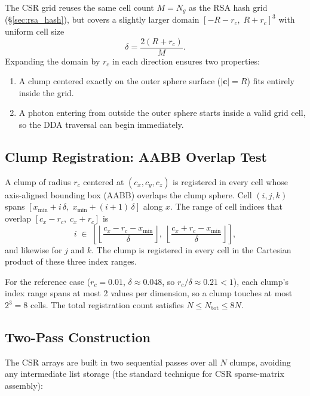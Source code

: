 \documentclass[english,a4paper]{my_memo}
\begin{document}
The CSR grid reuses the same cell count $M = N_g$ as the RSA hash grid
(\S\ref{sec:rsa_hash}), but covers a slightly larger domain
$[-R - r_c,\; R + r_c]^3$ with uniform cell size
\begin{equation}
  \delta = \frac{2(R + r_c)}{M}.
\end{equation}
Expanding the domain by $r_c$ in each direction ensures two properties:
\begin{enumerate}
  \item A clump centered exactly on the outer sphere surface
        ($|\mathbf{c}| = R$) fits entirely inside the grid.
  \item A photon entering from outside the outer sphere starts inside a
        valid grid cell, so the DDA traversal can begin immediately.
\end{enumerate}

\subsection{Clump Registration: AABB Overlap Test}
\label{sec:aabb}

A clump of radius $r_c$ centered at $(c_x, c_y, c_z)$ is registered in every
cell whose axis-aligned bounding box (AABB) overlaps the clump sphere.
Cell $(i,j,k)$ spans $[x_\mathrm{min}+i\,\delta,\; x_\mathrm{min}+(i+1)\,\delta]$
along $x$.  The range of cell indices that overlap $[c_x - r_c,\; c_x + r_c]$ is
\begin{equation}
  i \;\in\; \left[
    \left\lfloor\frac{c_x - r_c - x_\mathrm{min}}{\delta}\right\rfloor,\;
    \left\lfloor\frac{c_x + r_c - x_\mathrm{min}}{\delta}\right\rfloor
  \right],
  \label{eq:aabb_range}
\end{equation}
and likewise for $j$ and $k$.  The clump is registered in every cell in the
Cartesian product of these three index ranges.

For the reference case ($r_c = 0.01$, $\delta \approx 0.048$, so
$r_c/\delta \approx 0.21 < 1$), each clump's index range spans at most 2
values per dimension, so a clump touches at most $2^3 = 8$ cells.  The total
registration count satisfies $N \le N_\mathrm{tot} \le 8N$.

\subsection{Two-Pass Construction}

The CSR arrays are built in two sequential passes over all $N$ clumps,
avoiding any intermediate list storage (the standard technique for CSR
sparse-matrix assembly):
\end{document}
